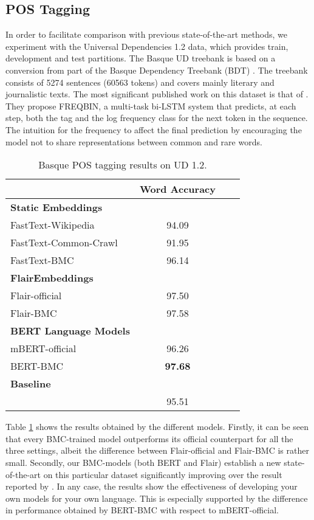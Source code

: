 \documentclass[10pt, a4paper]{article}
\begin{document}
\subsection{POS Tagging}\label{sec:pos-tagging}

In order to facilitate comparison with previous state-of-the-art methods, we experiment with the Universal Dependencies 1.2 data, which provides train, development and test partitions. The Basque UD treebank \cite{aranzabe2015automatic} is based on a conversion from part of the Basque Dependency Treebank (BDT) \cite{aduriz2003construction}. The treebank consists of 5274 sentences (60563 tokens) and covers mainly literary and journalistic texts. The most significant published work on this dataset is that of \cite{plank-etal-2016-multilingual}. They propose FREQBIN, a multi-task bi-LSTM system that predicts, at each step, both the tag and the log frequency class for the next token in the sequence. The intuition for the frequency to affect the final prediction by encouraging the model not to share representations between common and rare words.

\begin{table}[!ht]\footnotesize
\centering
\begin{tabular}{@{\hspace{0.3cm}}lccc} \hline
 \textbf{} & \textbf{Word Accuracy} \\ \hline
\textbf{Static Embeddings} & \\
FastText-Wikipedia & 94.09 \\
FastText-Common-Crawl & 91.95 \\
FastText-BMC  & 96.14 \\ \hline
\textbf{FlairEmbeddings} \\
Flair-official & 97.50 \\
Flair-BMC  &  97.58 \\ \hline
\textbf{BERT Language Models}\\
mBERT-official &  96.26 \\
BERT-BMC & \textbf{97.68} \\ \hline
\textbf{Baseline} \\
\cite{plank-etal-2016-multilingual} & 95.51 \\ \hline
\end{tabular}
\caption{Basque POS tagging results on UD 1.2.}\label{tab:pos}
\end{table}

Table \ref{tab:pos} shows the results obtained by the different models. Firstly, it can be seen that every BMC-trained model outperforms its official counterpart for all the three settings, albeit the difference between Flair-official and Flair-BMC is rather small. Secondly, our BMC-models (both BERT and Flair) establish a new state-of-the-art on this particular dataset significantly improving over the result reported by \cite{plank-etal-2016-multilingual}. In any case, the results show the effectiveness of developing your own models for your own language. This is especially supported by the difference in performance obtained by BERT-BMC with respect to mBERT-official.
\end{document}
